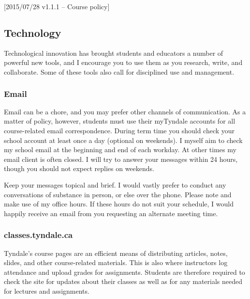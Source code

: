 [2015/07/28 v1.1.1 -- Course policy]

\subsection{Technology}
\label{technology}

Technological innovation has brought students and educators a number of
powerful new tools, and I encourage you to use them as you research, write, and
collaborate. Some of these tools also call for disciplined use and management.

\subsubsection{Email}
\label{email}

Email can be a chore, and you may prefer other channels of communication. As a
matter of policy, however, students must use their myTyndale accounts for all
course-related email correspondence. During term time you should check your
school account at least once a day (optional on weekends). I myself aim to
check my school email at the beginning and end of each workday. At other times
my email client is often closed. I will try to answer your messages within 24
hours, though you should not expect replies on weekends.

Keep your messages topical and brief. I would vastly prefer to conduct any
conversations of substance in person, or else over the phone. Please note and
make use of my office hours. If these hours do not suit your schedule, I would
happily receive an email from you requesting an alternate meeting time.


\subsubsection{classes.tyndale.ca}
\label{lms}

Tyndale's course pages are an efficient means of distributing articles, notes,
slides, and other course-related materials. This is also where instructors log
attendance and upload grades for assignments. Students are therefore required to
check the site for updates about their classes as well as for any materials
needed for lectures and assignments.

